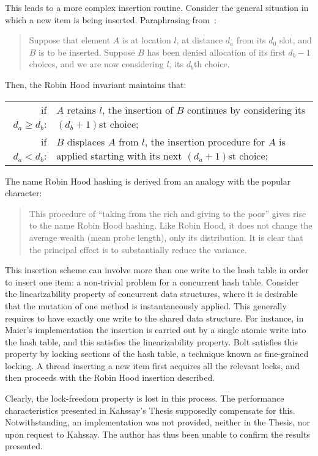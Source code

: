 This leads to a more complex insertion routine.
Consider the general situation in which a new item is being inserted.
Paraphrasing from~\cite{robin-hood}:
\begin{quote}
	Suppose that element $A$ is at location $l$, at distance $d_a$ from its $d_0$ slot, and $B$ is to be inserted.
	Suppose $B$ has been denied allocation of its first $d_b - 1$ choices, and we are now considering $l$, its $d_b$th choice.
\end{quote}
Then, the Robin Hood invariant maintains that:

\begin{tabular}{rp{8cm}}
	if $d_a \geq d_b$: & $A$ retains $l$, the insertion of $B$ continues by considering its $(d_b + 1)$st choice; \\
	if $d_a < d_b$: & $B$ displaces $A$ from $l$, the insertion procedure for $A$ is applied starting with its next $(d_a + 1)$st choice; \\
\end{tabular}

The name Robin Hood hashing is derived from an analogy with the popular character:
\begin{quote}
	This procedure of ``taking from the rich and giving to the poor'' gives rise to the name Robin Hood hashing.
	Like Robin Hood, it does not change the average wealth (mean probe length), only its distribution.
	It is clear that the principal effect is to substantially reduce the variance.
\end{quote}

This insertion scheme can involve more than one write to the hash table in order to insert one item: a non-trivial problem for a concurrent hash table.
Consider the linearizability property of concurrent data structures, where it is desirable that the mutation of one method is instantaneously applied.
This generally requires to have exactly one write to the shared data structure.
For instance, in Maier's implementation the insertion is carried out by a single atomic write into the hash table, and this satisfies the linearizability property.
Bolt satisfies this property by locking sections of the hash table, a technique known as fine-grained locking.
A thread inserting a new item first acquires all the relevant locks, and then proceeds with the Robin Hood insertion described.

Clearly, the lock-freedom property is lost in this process.
The performance characteristics presented in Kahssay's Thesis supposedly compensate for this.
Notwithstanding, an implementation was not provided, neither in the Thesis, nor upon request to Kahssay.
The author has thus been unable to confirm the results presented.

